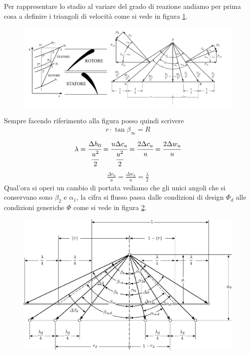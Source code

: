 Per rappresentare lo stadio al variare del grado di reazione andiamo per prima cosa a definire i triangoli di velocità come si vede in figura \ref{fig:StadioRipetuto}.
\begin{figure}
\centering
  \includegraphics[width=\textwidth]{fig/StadioRipetuto.pdf}
\caption{}
\label{fig:StadioRipetuto}
\end{figure}
Sempre facendo riferimento alla figura posso quindi scrivere
\begin{align*}
r \cdot \tan \beta_{\infty} = R 
\end{align*}
\begin{align*}
\lambda = \cfrac{\Delta h_0}{\cfrac{u^2}{2}} = \cfrac{u \Delta c_u}{\cfrac{u^2}{2}} = \cfrac{2 \Delta c_u}{u} = \cfrac{2 \Delta w_u}{u}
\end{align*}
\begin{align*}
\frac{\Delta c_u}{u} = \frac{\Delta w_u}{u} = \frac{\lambda}{2}
\end{align*}
Qual'ora si operi un cambio di portata vediamo che gli unici angoli che si conservano sono $\beta_2$ e $\alpha_1$, la cifra si flusso passa dalle condizioni di design $\Phi_d$ alle condizioni generiche $\Phi$ come si vede in figura \ref{fig:CondFuoriProg}.
\begin{figure}
\centering
  \includegraphics[width=\textwidth]{fig/CondFuoriProg.pdf}
\caption{}
\label{fig:CondFuoriProg}
\end{figure}

